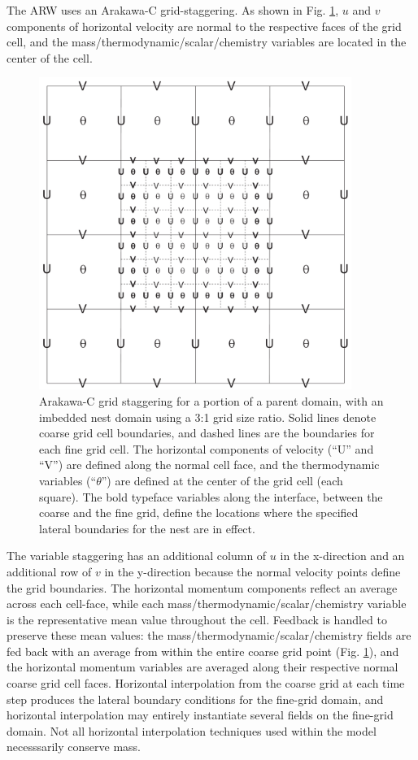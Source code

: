 The ARW uses an Arakawa-C grid-staggering.  As shown in Fig.
\ref{figure:cg_fg}, $u$ and $v$ components 
of horizontal velocity are normal to the respective faces of the 
grid cell, and the mass/thermodynamic/scalar/chemistry variables are located 
in the center of the cell.   

%
%
\begin{figure}
  \centering
  \includegraphics[width=4in]{figures/cg_fg.pdf}
  \caption{\label{figure:cg_fg}
Arakawa-C grid staggering for a portion of a parent domain, 
with an imbedded nest domain using a 3:1 grid size ratio.  Solid lines
denote coarse grid cell boundaries, and dashed lines are the
boundaries for each fine grid cell.  The horizontal components of
velocity (``U'' and ``V'') are defined along the normal cell face, and
the thermodynamic variables (``$\theta$'') are defined at the center of
the grid cell (each square).  The bold typeface variables along the
interface, between the coarse and the fine grid, define the locations
where the specified lateral boundaries for the nest are in
effect.  } \end{figure}

The variable staggering has an additional column 
of $u$ in the x-direction and an additional row of $v$ in the y-direction
because the normal velocity points define the grid boundaries.
The horizontal momentum components reflect an average across each 
cell-face, while each mass/thermodynamic/scalar/chemistry variable
is the representative mean value throughout the cell.  
Feedback is handled to preserve these mean values: the mass/thermodynamic/scalar/chemistry
fields are fed back with an average from within the entire 
coarse grid point (Fig. \ref{figure:cg_fg}), and the horizontal momentum variables are
averaged along their respective normal coarse grid cell faces.
Horizontal interpolation from the coarse grid at each time step produces the lateral boundary
conditions for the fine-grid domain, and horizontal interpolation may entirely 
instantiate several fields on the fine-grid domain.
Not all horizontal interpolation techniques used within the model necesssarily conserve mass.

